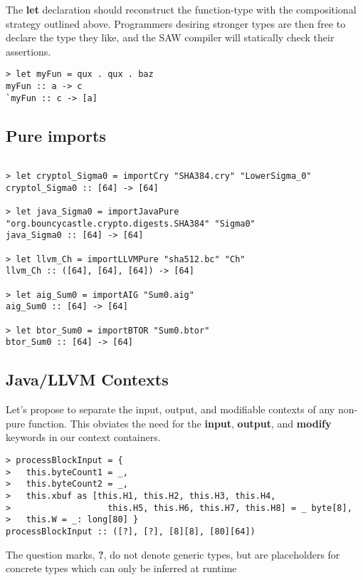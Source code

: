 \documentclass[11pt]{amsart}
\renewcommand{\b}[1]{\textbf{#1}}
\begin{document}
\vspace{.125in}The \b{let} declaration should reconstruct the function-type with the compositional strategy outlined above.  Programmers desiring stronger types are then free to declare the type they like, and the SAW compiler will statically check their assertions.\\

\begin{verbatim}
> let myFun = qux . qux . baz
myFun :: a -> c
`myFun :: c -> [a]
\end{verbatim}

\clearpage
\subsection*{Pure imports}

\begin{verbatim}

> let cryptol_Sigma0 = importCry "SHA384.cry" "LowerSigma_0"
cryptol_Sigma0 :: [64] -> [64]

> let java_Sigma0 = importJavaPure "org.bouncycastle.crypto.digests.SHA384" "Sigma0"
java_Sigma0 :: [64] -> [64]

> let llvm_Ch = importLLVMPure "sha512.bc" "Ch"
llvm_Ch :: ([64], [64], [64]) -> [64]

> let aig_Sum0 = importAIG "Sum0.aig"
aig_Sum0 :: [64] -> [64]

> let btor_Sum0 = importBTOR "Sum0.btor"
btor_Sum0 :: [64] -> [64]

\end{verbatim}

\clearpage
\subsection*{Java/LLVM Contexts}

Let's propose to separate the input, output, and modifiable contexts of any non-pure function.  This obviates the need for the \b{input}, \b{output}, and \b{modify} keywords in our context containers.

\begin{verbatim}
> processBlockInput = {
>   this.byteCount1 = _,
>   this.byteCount2 = _,
>   this.xbuf as [this.H1, this.H2, this.H3, this.H4,
>                   this.H5, this.H6, this.H7, this.H8] = _ byte[8],
>   this.W = _: long[80] }
processBlockInput :: ([?], [?], [8][8], [80][64])
\end{verbatim}

\vspace{.125in}
The question marks, \b{?}, do not denote generic types, but are placeholders for concrete types which can only be inferred at runtime
\end{document}
